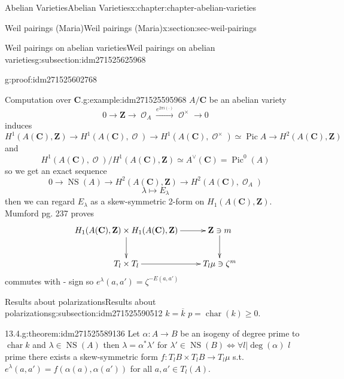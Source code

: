 \documentclass[oneside,10pt,]{book}
\numberwithin{equation}{section}
\newcommand{\sheaf}[1]{\operatorname{\mathcal{#1}}}
\newcommand{\ZZ}{\mathbf{Z}}
\newcommand{\CC}{\mathbf{C}}
\DeclareMathOperator{\Pic}{Pic}
\DeclareMathOperator{\characteristic}{char}
\DeclareMathOperator{\NS}{NS}
\begin{document}
\begin{chapterptx}{Abelian Varieties}{}{Abelian Varieties}{}{}{x:chapter:chapter-abelian-varieties}
\begin{sectionptx}{Weil pairings (Maria)}{}{Weil pairings (Maria)}{}{}{x:section:sec-weil-pairings}
\begin{subsectionptx}{Weil pairings on abelian varieties}{}{Weil pairings on abelian varieties}{}{}{g:subsection:idm271525625968}
\begin{proofptx}{}{g:proof:idm271525602768}
%
\end{proofptx}
\begin{example}{Computation over \(\CC\).}{g:example:idm271525595968}%
\(A/\CC\) be an abelian variety%
\begin{equation*}
0\to \ZZ \to \sheaf O_A \xrightarrow{e^{2\pi i (\cdot)}} \sheaf O^\times \to 0
\end{equation*}
induces%
\begin{equation*}
H^1(A(\CC), \ZZ) \to H^1(A(\CC), \sheaf O) \to H^1(A(\CC), \sheaf O^\times) \simeq \Pic A \to H^2(A(\CC), \ZZ)
\end{equation*}
and%
\begin{equation*}
H^1(A(\CC), \sheaf O)/ H^1(A(\CC), \ZZ) \simeq A^\vee(\CC) = \Pic^0(A)
\end{equation*}
so we get an exact sequence%
\begin{equation*}
0 \to \NS(A) \to H^2 (A(\CC),\ZZ) \to H^2(A(\CC),\sheaf O_A)
\end{equation*}
%
\begin{equation*}
\lambda \mapsto E_\lambda
\end{equation*}
then we can regard \(E_\lambda\) as a skew-symmetric 2-form on \(H_1(A(\CC), \ZZ)\). Mumford pg. 237 proves%
\begin{equation*}
\xymatrix{
H_1(A(\CC), \ZZ) \times H_1(A(\CC), \ZZ) \ar[r] \ar[d] & \ZZ\ni m \ar[d] \\
T_l \times T_l \ar[r] & T_l \mu \ni \zeta^m
}
\end{equation*}
commutes with - sign so \(e^\lambda (a,a') = \zeta^{-E(a,a')}\)%
\end{example}
\end{subsectionptx}
%
%
\typeout{************************************************}
\typeout{************************************************}
%
\begin{subsectionptx}{Results about polarizations}{}{Results about polarizations}{}{}{g:subsection:idm271525590512}
\(k = \overline k\) \(p = \characteristic (k) \ge 0\).%
\begin{theorem}{13.4.}{}{g:theorem:idm271525589136}%
Let \(\alpha\colon A\to B\) be an isogeny of degree prime to \(\characteristic k\) and \(\lambda \in \NS(A)\) then \(\lambda = \alpha^* \lambda '\) for \(\lambda ' \in \NS(B) \iff \forall l |\deg(\alpha)\) \(l\) prime there exists a skew-symmetric form \(f\colon T_lB\times T_lB \to T_l\mu\) s.t. \(e^\lambda(a,a') = f(\alpha(a), \alpha(a'))\) for all \(a,a' \in T_l(A)\).%
\end{theorem}

\end{subsectionptx}
\end{sectionptx}
\end{chapterptx}
\end{document}
